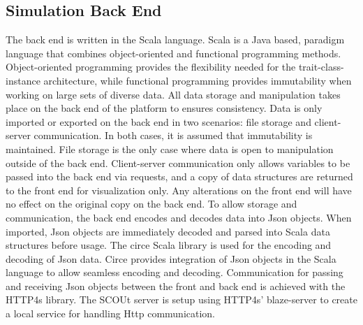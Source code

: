 \subsection{Simulation Back End}
The back end is written in the Scala language.
Scala is a Java based, paradigm language that combines object-oriented and functional programming methods.
Object-oriented programming provides the flexibility needed for the trait-class-instance architecture, while functional programming provides immutability when working on large sets of diverse data.
All data storage and manipulation takes place on the back end of the platform to ensures consistency.
Data is only imported or exported on the back end in two scenarios: file storage and client-server communication.
In both cases, it is assumed that immutability is maintained.
File storage is the only case where data is open to manipulation outside of the back end.
Client-server communication only allows variables to be passed into the back end via requests, and a copy of data structures are returned to the front end for visualization only.
Any alterations on the front end will have no effect on the original copy on the back end.
To allow storage and communication, the back end encodes and decodes data into Json objects.
When imported, Json objects are immediately decoded and parsed into Scala data structures before usage.
The circe Scala library  is used for the encoding and decoding of Json data.
Circe provides integration of Json objects in the Scala language to allow seamless encoding and decoding.
Communication for passing and receiving Json objects between the front and back end is achieved with the HTTP4s library. 
The SCOUt server is setup using HTTP4s' blaze-server to create a local service for handling Http communication.


